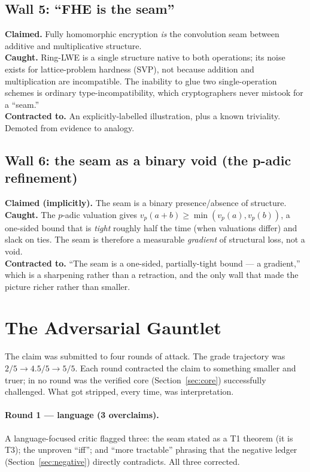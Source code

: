 \documentclass[11pt,a4paper]{article}
\newcommand{\TT}{\textsf{T1}}
\newcommand{\Th}{\textsf{T3}}
\theoremstyle{definition}
\theoremstyle{plain}
\begin{document}
\subsection{Wall 5: ``FHE is the seam''}
\textbf{Claimed.} Fully homomorphic encryption \emph{is} the convolution seam between additive and
multiplicative structure.\\
\textbf{Caught.} Ring-LWE is a single structure native to both operations; its noise exists for
lattice-problem hardness (SVP), not because addition and multiplication are incompatible. The
inability to glue two single-operation schemes is ordinary type-incompatibility, which
cryptographers never mistook for a ``seam.''\\
\textbf{Contracted to.} An explicitly-labelled illustration, plus a known triviality. Demoted from
evidence to analogy.

\subsection{Wall 6: the seam as a binary void (the p-adic refinement)}
\textbf{Claimed (implicitly).} The seam is a binary presence/absence of structure.\\
\textbf{Caught.} The $p$-adic valuation gives $v_p(a+b)\ge \min(v_p(a),v_p(b))$, a one-sided
bound that is \emph{tight} roughly half the time (when valuations differ) and slack on ties. The
seam is therefore a measurable \emph{gradient} of structural loss, not a void.\\
\textbf{Contracted to.} ``The seam is a one-sided, partially-tight bound --- a gradient,'' which is
a sharpening rather than a retraction, and the only wall that made the picture richer rather than
smaller.

\section{The Adversarial Gauntlet}\label{sec:gauntlet}

The claim was submitted to four rounds of attack. The grade trajectory was
$2/5 \to 4.5/5 \to 5/5$. Each round contracted the claim to something smaller and truer; in no
round was the verified core (Section~\ref{sec:core}) successfully challenged. What got stripped,
every time, was interpretation.

\paragraph{Round 1 --- language (3 overclaims).}
A language-focused critic flagged three: the seam stated as a \TT{} theorem (it is \Th); the
unproven ``iff''; and ``more tractable'' phrasing that the negative ledger (Section~\ref{sec:negative})
directly contradicts. All three corrected.
\end{document}
